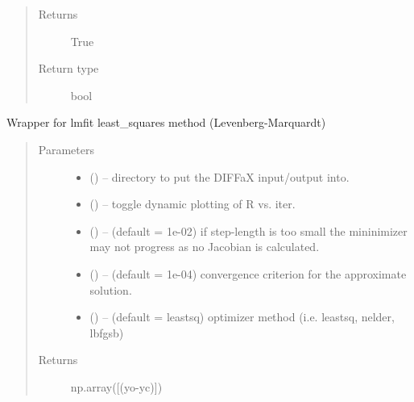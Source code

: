 \documentclass[letterpaper,10pt,english]{sphinxmanual}
\begin{document}
\begin{fulllineitems}
\begin{fulllineitems}
\begin{quote}
\begin{description}
\item[{Returns}] \leavevmode
True

\item[{Return type}] \leavevmode
bool

\end{description}\end{quote}

\end{fulllineitems}


\begin{fulllineitems}
\label{\detokenize{rst/refinement:mstack.refinement.Refinement.lsq_minimize}}
Wrapper for lmfit least\_squares method (Levenberg-Marquardt)
\begin{quote}\begin{description}
\item[{Parameters}] \leavevmode\begin{itemize}
\item {} 
 () -- directory to put the DIFFaX input/output into.

\item {} 
 () -- toggle dynamic plotting of R vs. iter.

\item {} 
 () -- (default = 1e-02) if step-length is too small the
mininimizer may not progress as no Jacobian is calculated.

\item {} 
 () -- (default = 1e-04) convergence criterion for the approximate solution.

\item {} 
 () -- (default = leastsq) optimizer method (i.e. leastsq, nelder, lbfgsb)

\end{itemize}

\item[{Returns}] \leavevmode
np.array({[}(yo-yc){]})


\end{description}
\end{quote}
\end{fulllineitems}
\end{fulllineitems}
\end{document}
